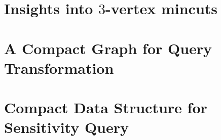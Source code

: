 \documentclass[letterpaper,11pt]{article}
\begin{document}
\section{Insights into \texorpdfstring{$3$}{3}-vertex mincuts} \label{sec:query-transformation}



\vspace{-6mm}
\section{A Compact Graph for Query Transformation}
\vspace{-2mm}

\vspace{-3mm}
\section{Compact Data Structure for Sensitivity Query} \label{sec:final-ds}
\vspace{-2mm}




\pagebreak




% 

\pagebreak
\appendix



% 
\end{document}
